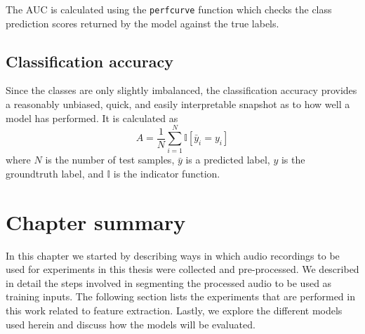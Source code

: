 The AUC is calculated using the \texttt{perfcurve} function which checks the
class prediction scores returned by the model against the true labels.

\subsection{Classification accuracy}

Since the classes are only slightly imbalanced, the classification accuracy
provides a reasonably unbiased, quick, and easily interpretable snapshot as to
how well a model has performed. It is calculated as
\begin{equation}
A = \frac{1}{N}\sum_{i=1}^{N} \mathbb{I}[\bar{y}_i = y_i]
\end{equation}
where $N$ is the number of test samples, $\bar{y}$ is a predicted label, $y$
is the groundtruth label, and $\mathbb{I}$ is the indicator function.

\section{Chapter summary}

In this chapter we started by describing ways in which audio recordings to be
used for experiments in this thesis were collected and pre-processed. We
described in detail the steps involved in segmenting the processed audio to be
used as training inputs. The following section lists the experiments that are
performed in this work related to feature extraction. Lastly, we explore the
different models used herein and discuss how the models will be evaluated.
